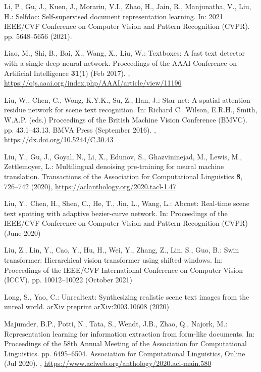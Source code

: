 \documentclass[runningheads]{llncs}
\begin{document}
\begin{thebibliography}{10}
Li, P., Gu, J., Kuen, J., Morariu, V.I., Zhao, H., Jain, R., Manjunatha, V.,
  Liu, H.: Selfdoc: Self-supervised document representation learning. In: 2021
  IEEE/CVF Conference on Computer Vision and Pattern Recognition (CVPR). pp.
  5648--5656 (2021). 

Liao, M., Shi, B., Bai, X., Wang, X., Liu, W.: Textboxes: A fast text detector
  with a single deep neural network. Proceedings of the AAAI Conference on
  Artificial Intelligence  \textbf{31}(1) (Feb 2017).
  ,
  \url{https://ojs.aaai.org/index.php/AAAI/article/view/11196}

Liu, W., Chen, C., Wong, K.Y.K., Su, Z., Han, J.: Star-net: A spatial attention
  residue network for scene text recognition. In: Richard C.~Wilson, E.R.H.,
  Smith, W.A.P. (eds.) Proceedings of the British Machine Vision Conference
  (BMVC). pp. 43.1--43.13. BMVA Press (September 2016). ,
  \url{https://dx.doi.org/10.5244/C.30.43}

Liu, Y., Gu, J., Goyal, N., Li, X., Edunov, S., Ghazvininejad, M., Lewis, M.,
  Zettlemoyer, L.: Multilingual denoising pre-training for neural machine
  translation. Transactions of the Association for Computational Linguistics
  \textbf{8},  726--742 (2020), \url{https://aclanthology.org/2020.tacl-1.47}

Liu, Y., Chen, H., Shen, C., He, T., Jin, L., Wang, L.: Abcnet: Real-time scene
  text spotting with adaptive bezier-curve network. In: Proceedings of the
  IEEE/CVF Conference on Computer Vision and Pattern Recognition (CVPR) (June
  2020)

Liu, Z., Lin, Y., Cao, Y., Hu, H., Wei, Y., Zhang, Z., Lin, S., Guo, B.: Swin
  transformer: Hierarchical vision transformer using shifted windows. In:
  Proceedings of the IEEE/CVF International Conference on Computer Vision
  (ICCV). pp. 10012--10022 (October 2021)

Long, S., Yao, C.: Unrealtext: Synthesizing realistic scene text images from
  the unreal world. arXiv preprint arXiv:2003.10608  (2020)

Majumder, B.P., Potti, N., Tata, S., Wendt, J.B., Zhao, Q., Najork, M.:
  Representation learning for information extraction from form-like documents.
  In: Proceedings of the 58th Annual Meeting of the Association for
  Computational Linguistics. pp. 6495--6504. Association for Computational
  Linguistics, Online (Jul 2020). ,
  \url{https://www.aclweb.org/anthology/2020.acl-main.580}


\end{thebibliography}
\end{document}
